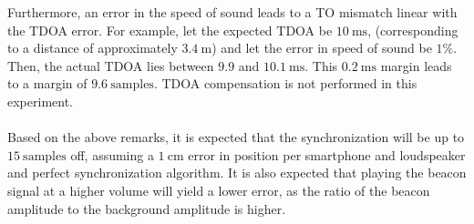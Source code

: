 \documentclass[a4paper, notitlepage]{report}
\begin{document}
Furthermore, an error in the speed of sound leads to a TO mismatch linear with the TDOA error. For example, let the expected TDOA be $10~\mathrm{ms}$, (corresponding to a distance of approximately $3.4~\mathrm{m}$) and let the error in speed of sound be $1\%$. Then, the actual TDOA lies between $9.9$ and $10.1~\mathrm{ms}$. This $0.2~\mathrm{ms}$ margin leads to a margin of $9.6~\mathrm{samples}$. TDOA compensation is not performed in this experiment.

\paragraph*{}
Based on the above remarks, it is expected that the synchronization will be up to $15~\mathrm{samples}$ off, assuming a $1~\mathrm{cm}$ error in position per smartphone and loudspeaker and perfect synchronization algorithm. It is also expected that playing the beacon signal at a higher volume will yield a lower error, as the ratio of the beacon amplitude to the background amplitude is higher.
\end{document}
